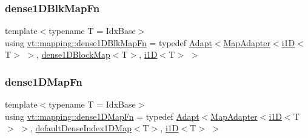 \subsubsection{\texorpdfstring{dense1\+D\+Blk\+Map\+Fn}{dense1DBlkMapFn}}
{\footnotesize\ttfamily template$<$typename T  = Idx\+Base$>$ \\
using \hyperlink{namespacevt_1_1mapping_aa1117076bb1d73ecb84905dc391c0528}{vt\+::mapping\+::dense1\+D\+Blk\+Map\+Fn} = typedef \hyperlink{namespacevt_1_1mapping_aafe187035ce8df02f31983e37cdb6a5d}{Adapt}$<$\hyperlink{namespacevt_1_1mapping_a41b113c28bb6430fbcb5be66e08ccf9f}{Map\+Adapter}$<$\hyperlink{namespacevt_1_1mapping_af0c14a9a77e0311b3d089143ed93ba76}{i1D}$<$T$>$ $>$, \hyperlink{namespacevt_1_1mapping_a2d49151f03d4ce393b01c620f6b18517}{dense1\+D\+Block\+Map}$<$T$>$, \hyperlink{namespacevt_1_1mapping_af0c14a9a77e0311b3d089143ed93ba76}{i1D}$<$T$>$ $>$}

\mbox{\label{namespacevt_1_1mapping_afe31b6db2c26ee24a6dd3cdf7b68415f}} 
\subsubsection{\texorpdfstring{dense1\+D\+Map\+Fn}{dense1DMapFn}}
{\footnotesize\ttfamily template$<$typename T  = Idx\+Base$>$ \\
using \hyperlink{namespacevt_1_1mapping_afe31b6db2c26ee24a6dd3cdf7b68415f}{vt\+::mapping\+::dense1\+D\+Map\+Fn} = typedef \hyperlink{namespacevt_1_1mapping_aafe187035ce8df02f31983e37cdb6a5d}{Adapt}$<$\hyperlink{namespacevt_1_1mapping_a41b113c28bb6430fbcb5be66e08ccf9f}{Map\+Adapter}$<$\hyperlink{namespacevt_1_1mapping_af0c14a9a77e0311b3d089143ed93ba76}{i1D}$<$T$>$ $>$, \hyperlink{namespacevt_1_1mapping_ae055a42b89a59fd6d0cc6d40f9abf3b5}{default\+Dense\+Index1\+D\+Map}$<$T$>$, \hyperlink{namespacevt_1_1mapping_af0c14a9a77e0311b3d089143ed93ba76}{i1D}$<$T$>$ $>$}

\mbox{\label{namespacevt_1_1mapping_a35647c2efdfa50549574fcbd05132dc0}} 
